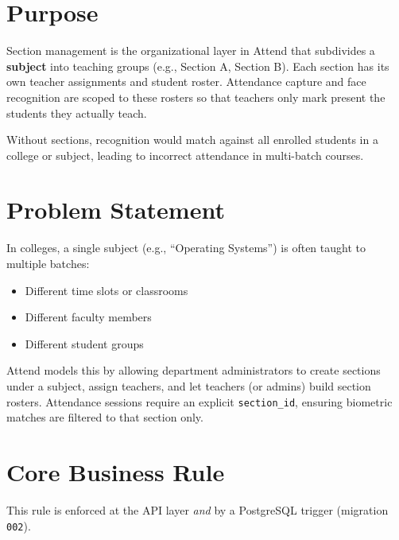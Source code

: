 \documentclass[11pt,a4paper,oneside]{report}
\begin{document}
\section{Purpose}

Section management is the organizational layer in Attend that subdivides a \textbf{subject} into teaching groups (e.g., Section A, Section B). Each section has its own teacher assignments and student roster. Attendance capture and face recognition are scoped to these rosters so that teachers only mark present the students they actually teach.

Without sections, recognition would match against all enrolled students in a college or subject, leading to incorrect attendance in multi-batch courses.

\section{Problem Statement}

In colleges, a single subject (e.g., ``Operating Systems'') is often taught to multiple batches:
\begin{itemize}[leftmargin=1.5em]
  \item Different time slots or classrooms
  \item Different faculty members
  \item Different student groups
\end{itemize}

Attend models this by allowing department administrators to create sections under a subject, assign teachers, and let teachers (or admins) build section rosters. Attendance sessions require an explicit \texttt{section\_id}, ensuring biometric matches are filtered to that section only.

\section{Core Business Rule}

\begin{center}
\end{center}

This rule is enforced at the API layer \emph{and} by a PostgreSQL trigger (migration \texttt{002}).
\end{document}
